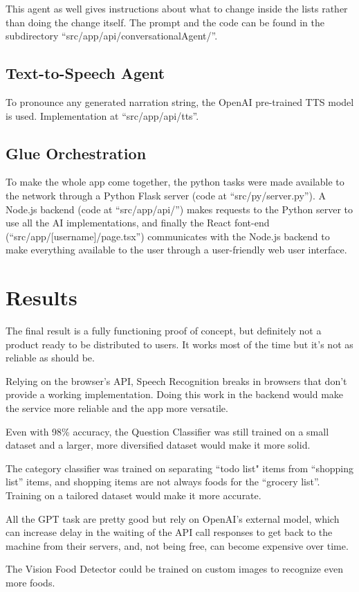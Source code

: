 \documentclass{article}
\begin{document}
This agent as well gives instructions about what to change inside the lists rather than doing the change itself. The prompt and the code can be found in the subdirectory ``src/app/api/conversationalAgent/''.


\subsection*{\color{draculayellow}Text-to-Speech Agent}

To pronounce any generated narration string, the OpenAI pre-trained TTS model is used. Implementation at ``src/app/api/tts''.

\subsection*{\color{draculagreen}Glue Orchestration}

To make the whole app come together, the python tasks were made available to the network through a Python Flask server (code at ``src/py/server.py''). A Node.js backend (code at ``src/app/api/'') makes requests to the Python server to use all the AI implementations, and finally the React font-end (``src/app/[username]/page.tsx'') communicates with the Node.js backend to make everything available to the user through a user-friendly web user interface.


\section*{\color{draculagreen}Results}

The final result is a fully functioning proof of concept, but definitely not a product ready to be distributed to users. It works most of the time but it's not as reliable as should be.

Relying on the browser's API, Speech Recognition breaks in browsers that don't provide a working implementation. Doing this work in the backend would make the service more reliable and the app more versatile.

Even with 98\% accuracy, the Question Classifier was still trained on a small dataset and a larger, more diversified dataset would make it more solid.

The category classifier was trained on separating ``todo list" items from ``shopping list'' items, and shopping items are not always foods for the ``grocery list''. Training on a tailored dataset would make it more accurate.

All the GPT task are pretty good but rely on OpenAI's external model, which can increase delay in the waiting of the API call responses to get back to the machine from their servers, and, not being free, can become expensive over time.

The Vision Food Detector could be trained on custom images to recognize even more foods.
\end{document}
